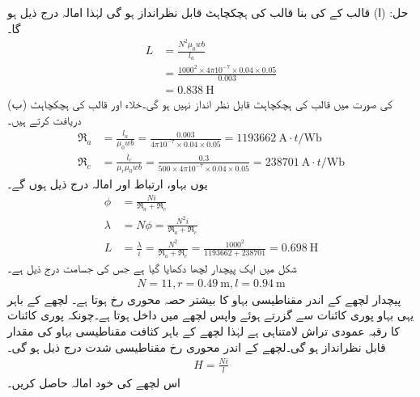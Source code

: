 حل:\quad
(ا) \quad 
 قالب کے   کی بنا قالب کی ہچکچاہٹ قابل نظرانداز ہو گی لہٰذا  امالہ درج ذیل ہو گا۔
\begin{align*}
L&=\frac{N^2 \mu_0 w b}{l_a}\\
&=\frac{1000^2 \times 4 \pi 10^{-7} \times 0.04 \times 0.05}{0.003}\\
&=\SI{0.838}{\henry}
\end{align*}
(ب) \quad
  کی صورت میں قالب کی ہچکچاہٹ قابل نظر انداز نہیں ہو گی۔خلاء اور قالب کی ہچکچاہٹ  دریافت کرتے ہیں۔
\begin{align*}
\Re_a&=\frac{l_a}{\mu_0 w b}=\frac{0.003}{4\pi 10^{-7} \times 0.04 \times 0.05}=\SI{1193662}{\ampere \cdot t \per \weber}\\
\Re_c&=\frac{l_c}{\mu_r \mu_0 w b}=\frac{0.3}{500 \times 4\pi 10^{-7} \times 0.04 \times 0.05}=\SI{238701}{\ampere \cdot t \per \weber}
\end{align*}
یوں بہاو، ارتباط اور امالہ درج ذیل ہوں گے۔
\begin{align*}
\phi&=\frac{N i}{\Re_a+\Re_c}\\
\lambda &= N \phi = \frac{N^2 i}{\Re_a+\Re_c}\\
L&=\frac{\lambda}{i}=\frac{N^2}{\Re_a+\Re_c}=\frac{1000^2}{\num{1193662}+\num{238701}}=\SI{0.698}{\henry}
\end{align*}
%
شکل  میں ایک پیچدار لچھا دکھایا گیا ہے جس کی جسامت درج ذیل ہے۔
\begin{align*}
N=11, r=\SI{0.49}{\meter},l=\SI{0.94}{\meter}
\end{align*}
پیچدار لچھے  کے اندر مقناطیسی بہاو  کا بیشتر حصہ محوری رخ ہوتا ہے۔ لچھے کے باہر یہی بہاو پوری کائنات سے گزرتے ہوئے واپس لچھے میں داخل ہوتا ہے۔چونکہ پوری کائنات کا رقبہ عمودی تراش  لامتناہی ہے لہٰذا لچھے کے باہر کثافت مقناطیسی بہاو  کی مقدار قابل نظرانداز ہو گی۔لچھے کے اندر محوری رخ مقناطیسی شدت درج ذیل ہو گی۔
\begin{align*}
H=\frac{N i}{l}
\end{align*}
اس لچھے کی خود امالہ حاصل کریں۔
